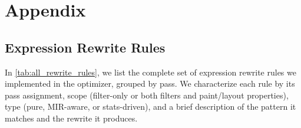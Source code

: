 \chapter{Appendix}\label{ch:appendix}
\renewcommand{\thefigure}{A\arabic{figure}}
\renewcommand{\thetable}{A\arabic{table}}
\renewcommand{\thelstlisting}{A\arabic{lstlisting}}
\renewcommand{\thesection}{A\arabic{section}}

\section{Expression Rewrite Rules}\label{app_rewrite_rules}

In \cref{tab:all_rewrite_rules}, we list the complete set of expression rewrite rules we implemented in the optimizer, grouped by pass.
We characterize each rule by its pass assignment, scope (filter-only or both filters and paint/layout properties), type (pure, MIR-aware, or stats-driven), and a brief description of the pattern it matches and the rewrite it produces.

